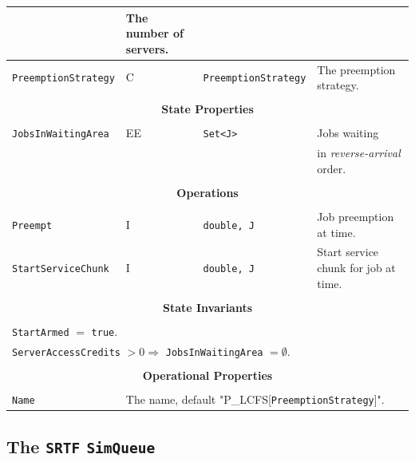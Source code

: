 \documentclass[12pt]{book}
\begin{document}
\begin{tabular}{|l|l|l|l|}
                               & The number of servers. \\
\hline
\lstinline|PreemptionStrategy| & C & \lstinline|PreemptionStrategy| & The preemption strategy. \\
\hline
\multicolumn{4}{|c|}{} \\
\multicolumn{4}{|c|}{\bf State  Properties} \\
\multicolumn{4}{|c|}{} \\
\hline
\lstinline|JobsInWaitingArea| & EE & \lstinline|Set<J>| & Jobs waiting \\
                              &    &                    & in {\em reverse-arrival\/} order. \\
\hline
\multicolumn{4}{|c|}{} \\
\multicolumn{4}{|c|}{\bf Operations} \\
\multicolumn{4}{|c|}{} \\
\hline
\lstinline|Preempt| & I & \lstinline|double, J| & Job preemption at time.\\
\hline
\lstinline|StartServiceChunk| & I & \lstinline|double, J| & Start service chunk for job at time.\\
\hline
\multicolumn{4}{|c|}{} \\
\multicolumn{4}{|c|}{\bf State  Invariants} \\
\multicolumn{4}{|c|}{} \\
\hline
\multicolumn{4}{|l|}{\lstinline|StartArmed| $=$ \lstinline|true|.} \\
\multicolumn{4}{|l|}{\lstinline|ServerAccessCredits| $> 0 \Rightarrow$ \lstinline|JobsInWaitingArea| $= \emptyset$.} \\
\hline
\multicolumn{4}{|c|}{} \\
\multicolumn{4}{|c|}{\bf Operational Properties} \\
\multicolumn{4}{|c|}{} \\
\hline
\lstinline|Name| & \multicolumn{3}{|l|}{The name, default "P\_LCFS[\lstinline|PreemptionStrategy|]".} \\
\hline
\end{tabular}

\subsection{The \lstinline{SRTF} \lstinline{SimQueue}}
\label{sec:SRTF}
\end{document}
